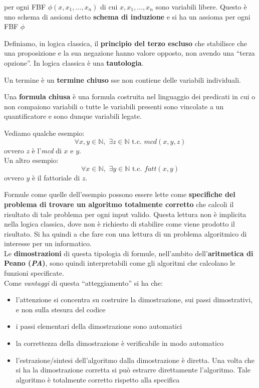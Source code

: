 \documentclass[a4paper,12pt, oneside]{book}
\begin{document}
\begin{shaded}
\begin{definizione}
    per ogni FBF $\phi(x,x_1,\ldots,x_n)$ di cui
    $x,x_1,\ldots,x_n$ sono variabili libere. Questo è uno schema di assiomi
    detto \textbf{schema di induzione} e si ha un assioma per ogni FBF
    $\phi$ 
  \end{definizione}
  \begin{definizione}
    Definiamo, in logica classica, il \textbf{principio del terzo escluso} che
    stabilisce che una proposizione e la sua negazione hanno valore opposto, non
    avendo una ``terza opzione''. In logica classica è una \textbf{tautologia}.
  \end{definizione}
  \begin{definizione}
    Un termine è un \textbf{termine chiuso} sse non contiene delle variabili
    individuali.  
  \end{definizione}
  \begin{definizione}
    Una \textbf{formula chiusa} è una formula costruita nel linguaggio dei
    predicati in cui o non compaiono variabili o tutte le variabili presenti
    sono vincolate a un quantificatore e sono dunque variabili legate. 
  \end{definizione}
\end{shaded}
\begin{esempio}
  Vediamo qualche esempio:
  \[\forall x,y\in\mathbb{N},\,\,\exists z\in\mathbb{N}\mbox{ t.c. }
    mcd(x,y,z)\]
  ovvero $z$ è l'\textit{mcd} di $x$ e $y$.\\
  Un altro esempio:
  \[\forall x\in \mathbb{N},\,\,\exists y\in \mathbb{N}\mbox{ t.c. }
    fatt(x,y)\]
  ovvero $y$ è il fattoriale di $z$.
\end{esempio}
Formule come quelle dell'esempio possono essere lette come \textbf{specifiche
  del problema di trovare un algoritmo totalmente corretto} che calcoli il
risultato di tale problema per ogni input valido. Questa lettura non è implicita
nella logica classica, dove non è richiesto di stabilire come viene prodotto il
risultato. Si ha quindi a che fare con una lettura di un problema algoritmico di
interesse per un informatico.\\
Le \textbf{dimostrazioni} di questa tipologia di formule, nell'ambito
dell'\textbf{aritmetica di Peano (\textit{PA})}, sono quindi interpretabili come
gli algoritmi che calcolano le funzioni specificate. \\
Come \textit{vantaggi} di questa ``atteggiamento'' si ha che:
\begin{itemize}
  \item l'attenzione si concentra su costruire la dimostrazione, sui passi
  dimostrativi, e non sulla stesura del codice
  \item i passi elementari della dimostrazione sono automatici
  \item la correttezza della dimostrazione è verificabile in modo automatico
  \item l'estrazione/sintesi dell'algoritmo dalla dimostrazione è diretta. Una
  volta che si ha la dimostrazione corretta si può estrarre direttamente
  l'algoritmo. Tale algoritmo è totalmente corretto rispetto alla specifica
\end{itemize}
\end{document}
